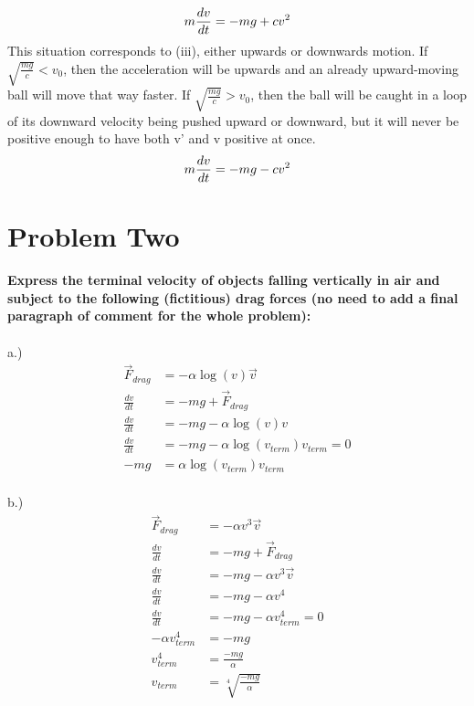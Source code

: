 \documentclass[10pt]{article} %
\begin{document}
\begin{equation}
  m\frac{dv}{dt} = -mg + cv^2\\
\end{equation}
This situation corresponds to (iii), either upwards or downwards motion. If $\sqrt{\frac{mg}{c}} < v_0$, then the acceleration will be upwards and an already upward-moving ball will move that way faster. If $\sqrt{\frac{mg}{c}} > v_0$, then the ball will be caught in a loop of its downward velocity being pushed upward or downward, but it will never be positive enough to have both v' and v positive at once.\\

\begin{equation}
  m\frac{dv}{dt} = -mg - cv^2\\
\end{equation}


\vspace{1 cm}

\section{Problem Two}
\textbf{Express  the  terminal  velocity  of  objects  falling  vertically  in  air  and  subject  to  the following (fictitious) drag  forces (no need to add a  final paragraph of comment  for the 
whole problem):} \\ \\

a.)
\begin{align}
  \vec{F}_{drag} &= -\alpha\log(v)\vec{v}\\
  \frac{dv}{dt} &= -mg + \vec{F}_{drag}\\
  \frac{dv}{dt} &= -mg - \alpha\log(v)v\\  
  \frac{dv}{dt} &= -mg - \alpha\log(v_{term})v_{term} = 0\\
  -mg &= \alpha\log(v_{term})v_{term}\\
\end{align}

b.)
\begin{align}
  \vec{F}_{drag} &= -\alpha v^3\vec{v}\\
  \frac{dv}{dt} &= -mg + \vec{F}_{drag}\\
  \frac{dv}{dt} &= -mg -\alpha v^3\vec{v}\\
  \frac{dv}{dt} &= -mg -\alpha v^4\\
  \frac{dv}{dt} &= -mg -\alpha v_{term}^4 = 0\\
  -\alpha v_{term}^4 &= -mg\\
  v_{term}^4 &= \frac{-mg}{\alpha}\\
  v_{term} &= \sqrt[4]{\frac{-mg}{\alpha}}\\
 \end{align}
\end{document}
